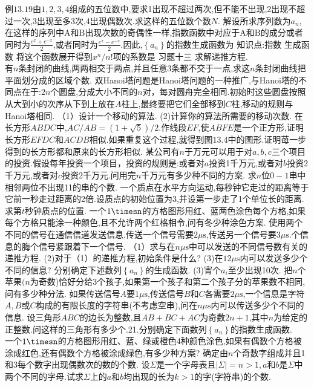 例$13.19$由$1,2,3,4$组成的五位数中,要求1出现不超过两次,但不能不出现,2出现不超过一次,3出现至多3次,4出现偶数次.求这样的五位数个数$N$.
解设所求序列数为$a_{n}$,在这样的序列中$\mathrm{A}$和$\mathrm{B}$出现次数的奇偶性一样,指数函数中对应于$\mathrm{A}$和$\mathrm{B}$的成分或者同时为$\frac{e^{x}+e^{-x}}{2}$,或者同时为$\frac{e^{x}-e^{-x}}{2}$.因此,$\left\{a_{n}\right\}$的指数生成函数为
知识点:指数
生成函数
将这个函数展开得到$x^{n}/n$!项的系数是
{习题十三}
求解递推方程.\\
有$n$条封闭的曲线,两两相交于两点,并且任意3条都不交于一点,求这$n$条封闭曲线把平面划分成的区域个数.
双Hanoi塔问题是Hanoi塔问题的一种推广,与Hanoi塔的不同点在于:$2n$个圆盘,分成大小不同的$n$对，每对圆舟完全相同.初始时这些圆盘按照从大到小的次序从下到上放在$A$柱上,最终要把它们全部移到$C$柱,移动的规则与Hanoi塔相同.
（1）设计一个移动的算法.
(2)计算你的算法所需要的移动次数.
在长方形$ABDC$中,$AC/AB=(1+\sqrt{5})/2$.作线段$EF$,使$ABFE$是一个正方形,证明长方形$EFDC$和$ACDB$相似.如果重复这个过程,就得到图$13.4$中的图形.证明苺一步得到的长方形都和原来的长方形相似.
某公司有$n$于万元可以用于对$a,b,c$三个项目的投资.假设每年投资一个项目，投资的规则是:或者对$a$投资1千万元,或者对$b$投资2千万元,或者对$c$投资2千万元.问用完$n$千万元有多少种不同的方案.
求$n$位$0-1$串中相邻两位不出现11的串的个数.
一个质点在水平方向运动,每秒钟它走过的距离等于它前一秒走过距离的2倍.设质点的初始位置为3,并设第一步走了1个单位长的距离.求第$t$秒钟质点的位置.
一个$1\timesn$的方格图形用红、蓝两色涂色每个方格,如果每个方格只能涂一种颜色,且不允许两个红格相令,问有冬少种涂色方案.
使用两个不同的信号在通信信道发送信息.传送一个信号需要$2\mu\mathrm{s}$,传送另一个信号要$3\mu\mathrm{s}.$个信息的脢个信号紧跟着下一个信号.
（1）求与在$n\mu\mathrm{s}$中可以发送的不同信号数有关的递推方程.
(2)对于（1）的递推方程,初始条件是什么?
(3)在$12\mu\mathrm{s}$内可以发送多少个不同的信息?
分别确定下述数列$\left\{a_{n}\right\}$的生成函数.
(3)寈个$a_{i}$至少出现10次.
把$n$个苹果$(n$为奇数)恰好分给3个孩子,如果第一个孩子和第二个孩子分的苹果数不相同,问有多少种分法.
如果传送信号$A$要$1\mu\mathrm{s}$,传送信号$B$和$C$各需要$2\mu\mathrm{s}$,一个信息是字符$A,B$或$C$构成的有限长度的字符串(不考虑空串),问在$n\mu\mathrm{s}$内可以传送多少个不同的信息.
设三角形$ABC$的边长为整数,且$AB+BC+AC$为奇数$2n+1$,其中$n$为给定的正整数.问这样的三角形有多少个.21.分别确定下面数列$\left\{a_{n}\right\}$的指数生成函数.\\
一个$1\timesn$的方格图形用红、蓝、绿或橙色4种颜色涂色,如果有偶数个方格被涂成红色,还有偶数个方格被涂成绿色,有多少种方案?
确定由$n$个奇数字组成并且1和3每个数字出现偶数次的数的个数.
设$\Sigma$是一个字母表且$|\Sigma|=n>1,a$和$b$是$\Sigma$中两个不同的字母.试求$\Sigma$上的$a$和$b$均出现的长为$k>1$的字(字符串)的个数.

